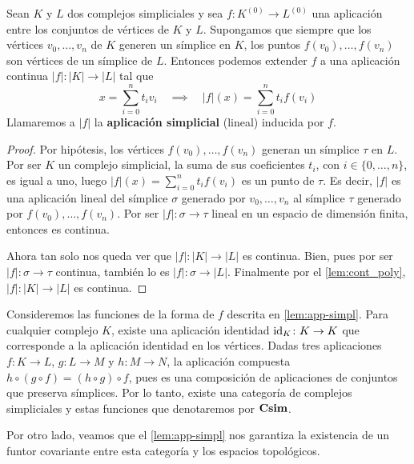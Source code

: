 \begin{lema}
	\label{lem:app-simpl} Sean $K$ y $L$ dos complejos simpliciales y sea $f: K^{(0)}
	\rightarrow L^{(0)}$ una aplicación entre los conjuntos de vértices de $K$ y $L$.
	Supongamos que siempre que los vértices $v_{0}, \ldots, v_{n}$ de $K$ generen
	un símplice en $K$, los puntos $f(v_{0}), \ldots, f(v_{n})$ son vértices de un
	símplice de $L$. Entonces podemos extender $f$ a una aplicación continua
	$|f| :|K| \rightarrow |L|$ tal que
	\[
	x = \sum_{i=0}^{n}t_{i}v_{i}\quad \implies \quad |f|(x) = \sum_{i=0}^{n}t_{i}
	f (v_{i})
	\]
	Llamaremos a $|f|$ la \textbf{aplicación simplicial} (lineal) inducida por $f$.
\end{lema}
\begin{proof}
	Por hipótesis, los vértices $f(v_{0}), \ldots, f(v_{n})$ generan un símplice
	$\tau$ en $L$. Por ser $K$ un complejo simplicial, la suma de sus coeficientes
	$t_{i}$, con $i \in \{0, \ldots, n\}$, es igual a uno, luego $|f|(x) = \sum_{i=0}
	^{n}t_{i}f(v_{i})$ es un punto de $\tau$. Es decir, $|f|$ es una aplicación lineal
	del símplice $\sigma$ generado por $v_{0}, \ldots, v_{n}$ al símplice $\tau$ generado
	por $f(v_{0}), \ldots, f(v_{n})$. Por ser $|f| : \sigma \rightarrow \tau$
	lineal en un espacio de dimensión finita, entonces es continua.
	
	Ahora tan solo nos queda ver que $|f| :|K| \rightarrow |L|$ es continua. Bien,
	pues por ser $|f| : \sigma \rightarrow \tau$ continua, también lo es
	$|f| : \sigma \rightarrow |L|$. Finalmente por el \autoref{lem:cont_poly},
	$|f| :|K| \rightarrow |L|$ es continua.
\end{proof}

Consideremos las funciones de la forma de $f$ descrita en \ref{lem:app-simpl}. Para
cualquier complejo $K$, existe una aplicación identidad $\operatorname{id}_{K}\colon K \to K$
que corresponde a la aplicación identidad en los vértices. Dadas tres aplicaciones
$f \colon K \to L$, $g \colon L \to M$ y $h : M \to N$, la aplicación compuesta $h
\circ (g \circ f) = (h \circ g) \circ f$, pues es una composición de
aplicaciones de conjuntos que preserva símplices. Por lo tanto, existe una
categoría de complejos simpliciales y estas funciones que denotaremos por
$\mathbf{Csim}$.

Por otro lado, veamos que el \autoref{lem:app-simpl} nos garantiza la existencia
de un funtor covariante entre esta categoría y los espacios topológicos.

